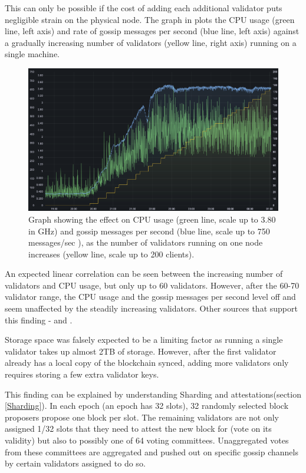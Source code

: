 This can only be possible if the cost of adding each additional validator puts negligible strain on the physical node. The graph in  \cite{Sutton2022ExploringSymphonious} plots the CPU usage (green line, left axis) and rate of gossip messages per second (blue line, left axis) against a gradually increasing number of validators (yellow line, right axis) running on a single machine.

\begin{figure}[htb!]
    \centering
    \includegraphics[width=15cm,center]{Figures/cpuValidatorsGossip.png}
    \caption{Graph showing the effect on CPU usage (green line, scale up to 3.80 in GHz) and gossip messages per second (blue line, scale up to 750 messages/sec ), as the number of validators running on one node increases (yellow line, scale up to 200 clients). \cite{Sutton2022ExploringSymphonious}}
    \label{Figure:validatorIncrease}
\end{figure}

An expected linear correlation can be seen between the increasing number of validators and CPU usage, but only up to 60 validators. However, after the 60-70 validator range, the CPU usage and the gossip messages per second level off and seem unaffected by the steadily increasing validators. Other sources that support  this finding - \cite{Roy2022StakingExchange} and \cite{2021HardwareEthstaker}.

Storage space was falsely expected to be a limiting factor as running a single validator takes up almost 2TB of storage. However, after the first validator already has a local copy of the blockchain synced, adding more validators only requires storing a few extra validator keys.

This finding can be explained by understanding Sharding and attestations(section \ref{Sharding}). In each epoch (an epoch has 32 slots), 32 randomly selected block proposers propose one block per slot. The remaining validators are not only assigned 1/32 slots that they need to attest the new block for (vote on its validity) but also to possibly one of 64 voting committees. Unaggregated votes from these committees are aggregated and pushed out on specific gossip channels by certain validators assigned to do so. 

